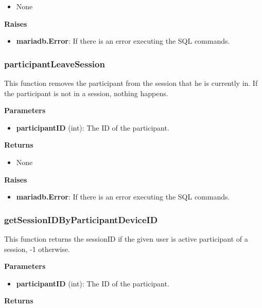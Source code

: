 \documentclass[oneside, nenglish]{sdqtechreport}
\begin{document}
\begin{itemize}
\begin{itemize}
    \item None
\end{itemize}

\textbf{Raises}

\begin{itemize}
    \item \textbf{mariadb.Error}: If there is an error executing the SQL commands.
\end{itemize}

\subsubsection{participantLeaveSession}

This function removes the participant from the session that he is currently in. If the participant is not in a session, nothing happens.

\textbf{Parameters}

\begin{itemize}
    \item \textbf{participantID} (int): The ID of the participant.
\end{itemize}

\textbf{Returns}

\begin{itemize}
    \item None
\end{itemize}

\textbf{Raises}

\begin{itemize}
    \item \textbf{mariadb.Error}: If there is an error executing the SQL commands.
\end{itemize}

\subsubsection{getSessionIDByParticipantDeviceID}

This function returns the sessionID if the given user is active participant of a session, -1 otherwise.

\textbf{Parameters}

\begin{itemize}
    \item \textbf{participantID} (int): The ID of the participant.
\end{itemize}

\textbf{Returns}


\end{itemize}
\end{document}
